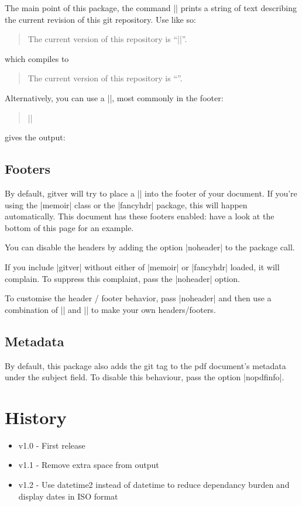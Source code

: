 \documentclass[a4paper]{ltxdoc}
\begin{document}

\DescribeMacro{\gitVer}
%
The main point of this package, the command |\gitVer| prints a string of text
describing the current revision of this git repository. Use like so:
\begin{quote}
	The current version of this repository is ``|\gitVer{}|''.
\end{quote}
which compiles to
\begin{quote}
	The current version of this repository is ``\gitVer{}''.
\end{quote}

\DescribeMacro{\versionBox}
Alternatively, you can use a |\versionBox|, most commonly in the footer:
\begin{quote}
	|\versionBox{}|
\end{quote}
%
gives the output:
\vspace{3mm}

\versionBox{}

\subsection{Footers} %
\label{sub:footers}

By default, \textsf{gitver} will try to place a |\versionBox| into the footer of
your document. If you're using the |memoir| class or the |fancyhdr| package,
this will happen automatically. This document has these footers enabled: have a
look at the bottom of this page for an example. 

You can disable the headers by adding the option |noheader| to the package call. 

If you include |gitver| without either of |memoir| or |fancyhdr| loaded, it will
complain. To suppress this complaint, pass the |noheader| option. 

To customise the header / footer behavior, pass |noheader| and then use a
combination of |\versionBox| and |\gitVer| to make your own headers/footers. 


\subsection{Metadata} %
\label{sub:metadata}

 By default, this package also adds the git tag to the
pdf document's metadata under the subject field. To disable this behaviour, pass
the option |nopdfinfo|. 


\section{History}

\begin{itemize}
	\item v1.0 - First release
	\item v1.1 - Remove extra space from output
	\item v1.2 - Use datetime2 instead of datetime to reduce dependancy burden
   				 and display dates in ISO format
\end{itemize}
\end{document}
